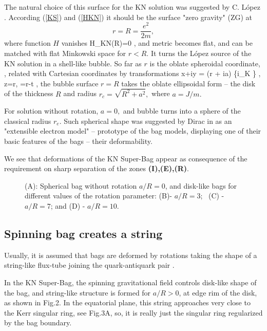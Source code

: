 \documentclass[aps,prd,twocolumn,showpacs]{revtex4}
\begin{document}
The natural choice of this surface for the KN solution  was suggested by C. L\'opez \cite{Lop}.
According (\ref{KS}) and (\ref{HKN}) it should be the surface "zero gravity" (ZG) at
\begin{equation} r = R = \frac {e^2}{2m} , \label{Hre}
\end{equation}
where function $H $ vanishes \be H_{KN}(R)=0 ,\label{HKNzg} \ee and metric becomes flat, and can be
matched with flat Minkowski space for $r < R .$  It turns the L\'opez source of the KN solution in
a shell-like bubble.
  So far as $r$ is the oblate spheroidal coordinate, \cite{DKS}, related with Cartesian coordinates
  by transformations
  \be x+iy = (r + ia) \exp \{i\phi_K \} \sin \theta , \quad
z=r\cos \theta, \quad \rho =r-t , \label{coordKerr} \ee
  the bubble surface $r=R$ takes the oblate ellipsoidal form -- the disk of the
  thickness $ R $ and radius  $r_c = \sqrt {R^2 + a^2} ,$ where
  $a=J/m .$

For solution without rotation, $a=0 ,$ and bubble turns into a sphere of the classical radius $ r_e .$
Such spherical shape was suggested by Dirac in \cite{DirBag} as an "extensible electron model" -- prototype of the bag
models, displaying one of their basic features of the bags -- their deformability.

We see that deformations of the KN Super-Bag appear as consequence of the requirement on sharp separation of the zones
\textbf{(I),(E),(R)}.



\begin{figure}[ht]
\centerline{}
\caption{(A):  Spherical bag without rotation $a/R =0$, and  disk-like bags for different values of the rotation parameter: (B)- $ a/R =3$; \ (C) - $ a/R =7$; and (D) - $ a/R =10$.}
\label{fig2}
\end{figure}

\subsection{Spinning bag creates a string}


Usually, it is assumed that bags are deformed by rotations taking the shape of  a string-like  flux-tube joining the
quark-antiquark pair \cite{MIT}.

In the KN Super-Bag, the spinning gravitational field controls disk-like shape of the bag, and
string-like structure is formed  for $a/R >0 $, at  edge rim of the disk, as shown  in Fig.2. In
the equatorial plane, this string approaches  very close to the Kerr singular ring, see Fig.3A, so,
it is really just the singular ring regularized by the bag boundary.
\end{document}
